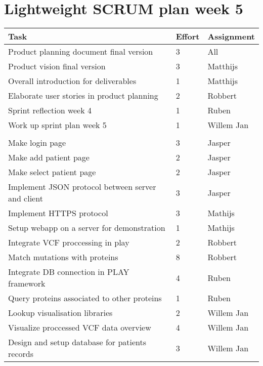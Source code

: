 \documentclass[a4paper]{report}
\begin{document}


\section*{Lightweight SCRUM plan week 5}

\setlength\extrarowheight{5pt}
\begin{table}[ht]
\begin{tabular}{p{8cm}|p{2cm}|p{3cm}}

\textbf{Task} & \textbf{Effort} & \textbf{Assignment}\\
\hline \hline

Product planning document final version & 3 & All\\
Product vision final version & 3 & Matthijs\\
Overall introduction for deliverables & 1 & Matthijs\\
Elaborate user stories in product planning & 2 & Robbert\\
Sprint reflection week 4 & 1 & Ruben\\
Work up sprint plan week 5 & 1 & Willem Jan\\

\vspace{10pt} & \vspace{10pt} & \vspace{10pt}\\

Make login page & 3 & Jasper\\
Make add patient page & 2 & Jasper\\
Make select patient page & 2 & Jasper\\
Implement JSON protocol between server and client & 3 & Jasper\\
Implement HTTPS protocol & 3 & Mathijs\\
Setup webapp on a server for demonstration & 1 & Mathijs\\
Integrate VCF proccessing in play & 2 & Robbert\\
Match mutations with proteins & 8 & Robbert\\
Integrate DB connection in PLAY framework & 4 & Ruben\\
Query proteins associated to other proteins & 1 & Ruben\\
Lookup visualisation libraries & 2 & Willem Jan\\
Visualize proccessed VCF data overview & 4 & Willem Jan\\
Design and setup database for patients records & 3 & Willem Jan\\
\end{tabular}
\end{table}
\end{document}
